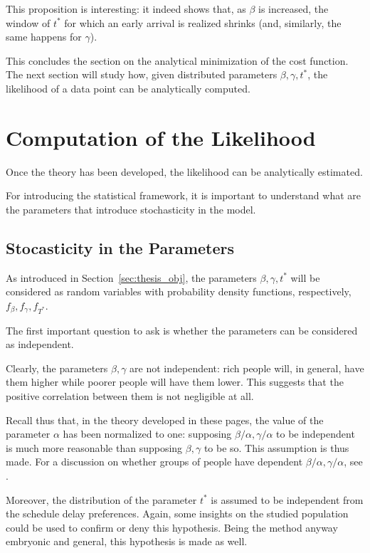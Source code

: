 This proposition is interesting:
it indeed shows that, as \(\beta\) is increased,
the window of \(t^*\) for which an early arrival is realized shrinks (and, similarly, the same happens for \(\gamma\)).

This concludes the section on the analytical minimization of the cost function.
The next section will study how, given distributed parameters \(\beta, \gamma, t^*\),
the likelihood of a data point can be analytically computed.

\section{Computation of the Likelihood}
\label{sec:lik}

Once the theory has been developed,
the likelihood can be analytically estimated.

For introducing the statistical framework,
it is important to understand what are the parameters that introduce stochasticity in the model.

\subsection{Stocasticity in the Parameters}

As introduced in Section~\ref{sec:thesis_obj}, the parameters \(\beta, \gamma, t^*\) will be considered as random variables
with probability density functions, respectively, \(f_\beta, f_\gamma, f_{T^*}\).

The first important question to ask is whether the parameters can be considered as independent.

Clearly, the parameters \(\beta, \gamma\) are not independent:
rich people will, in general, have them higher while poorer people will have them lower.
This suggests that the positive correlation between them is not negligible at all.

Recall thus that, in the theory developed in these pages,
the value of the parameter \(\alpha\) has been normalized to one:
supposing \(\beta/\alpha, \gamma/\alpha\) to be independent is much more reasonable than supposing \(\beta, \gamma\) to be so.
This assumption is thus made. For a discussion on whether groups of people have dependent \(\beta/\alpha, \gamma/\alpha\), see \cite{LindseyBook}.

Moreover, the distribution of the parameter \(t^*\) is assumed to be independent from the schedule delay preferences.
Again, some insights on the studied population could be used to confirm or deny this hypothesis.
Being the method anyway embryonic and general, this hypothesis is made as well.

